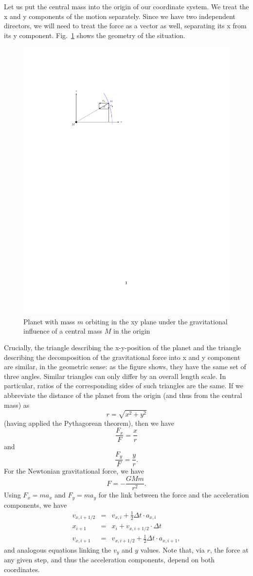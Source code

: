 \documentclass[twocolumn,apj]{openjournal}
\newcommand{\be}{\begin{equation}}
\newcommand{\ee}{\end{equation}}
\newcommand{\bea}{\begin{eqnarray}}
\newcommand{\eea}{\end{eqnarray}}
\begin{document}
Let us put the central mass into the origin of our coordinate system. We treat the x and y components of the motion separately. Since we have two independent directors, we will need to treat the force as a vector as well, separating its x from its y component. Fig.~\ref{2DForce} shows the geometry of the situation.
\begin{figure}[htbp]
\begin{center}
\includegraphics[width=0.8\linewidth]{force-triangle.pdf}
\caption{Planet with mass $m$ orbiting in the xy plane under the gravitational influence of a central mass $M$ in the origin}
\label{2DForce}
\end{center}
\end{figure}
Crucially, the triangle describing the x-y-position of the planet and the triangle describing the decomposition of the gravitational force into x and y component are similar, in the geometric sense: as the figure shows, they have the same set of three angles. Similar triangles can only differ by an overall length scale. In particular, ratios of the corresponding sides of such triangles are the same. If we abbreviate the distance of the planet from the origin (and thus from the central mass) as 
\be
r=\sqrt{x^2+y^2}
\ee
(having applied the Pythagorean theorem), then we have
\be
\frac{F_x}{F} = \frac{x}{r}
\ee
and
\be
\frac{F_y}{F} = \frac{y}{r}.
\ee
For the Newtonian gravitational force, we have
\be
F = -\frac{GMm}{r^2}.
\ee
Using $F_x = ma_x$ and $F_y=ma_y$ for the link between the force and the acceleration components, we have
\bea
v_{x,i+1/2} &=& v_{x,i} + \frac{1}{2}\Delta t\cdot a_{x,i}\\[0.5em]
x_{i+1} &=& x_i + v_{x,i+1/2}\cdot\Delta t\\[0.5em]
v_{x,i+1} &=& v_{x,i+1/2} + \frac{1}{2}\Delta t\cdot a_{x,i+1},
\eea
and analogous equations linking the $v_y$ and $y$ values. Note that, via $r$, the force at any given step, and thus the acceleration components, depend on both coordinates. 
\end{document}
